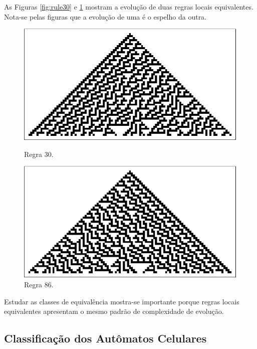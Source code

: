 \documentclass[12pt,a4paper]{article}
\begin{document}
As Figuras \ref{fig:rule30} e \ref{fig:rule86} mostram a evolução de duas regras locais
equivalentes. Nota-se pelas figuras que a evolução de uma é o espelho da outra.

\begin{figure}[ht]
\begin{minipage}[b]{0.5\linewidth}
\centering
\includegraphics[scale=0.85]{img/rule30.eps}
\caption{Regra 30.}
\label{fig:rule30}
\end{minipage}
\hspace{0.5cm}
\begin{minipage}[b]{0.5\linewidth}
\centering
\includegraphics[scale=0.85]{img/rule86.eps}
\caption{Regra 86.}
\label{fig:rule86}
\end{minipage}
\end{figure}

Estudar as classes de equivalência mostra-se importante porque regras locais
equivalentes apresentam o mesmo padrão de complexidade de evolução.

\subsection{Classificação dos Autômatos Celulares}
\end{document}
